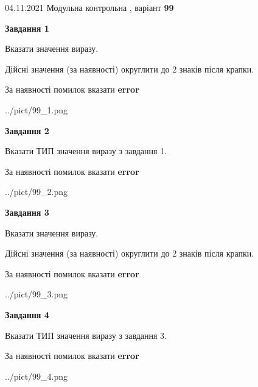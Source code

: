 \documentclass[11pt, ukrainian]{article}
\begin{document}
{04.11.2021 Модульна контрольна , варіант  \No \textbf { 99 }\par}
{
\begin {large}
{\begin {center}\textbf{Завдання 1}\end {center}}\par
Вказати значення виразу. \par
Дійсні значення (за наявності) округлити до 2 знаків після крапки. \par
За наявності помилок вказати \textbf{error}

\begin{center}
	{../pict/99_1.png}
\end{center}
\newpage

{\begin {center}\textbf{Завдання 2}\end {center}}\par
Вказати ТИП значення виразу з завдання 1. \par
За наявності помилок вказати \textbf{error}

\begin{center}
	{../pict/99_2.png}
\end{center}
\newpage

{\begin {center}\textbf{Завдання 3}\end {center}}\par
Вказати значення виразу. \par
Дійсні значення (за наявності) округлити до 2 знаків після крапки. \par
За наявності помилок вказати \textbf{error}

\begin{center}
	{../pict/99_3.png}
\end{center}
\newpage

{\begin {center}\textbf{Завдання 4}\end {center}}\par
Вказати ТИП значення виразу з завдання 3. \par
За наявності помилок вказати \textbf{error}

\begin{center}
	{../pict/99_4.png}
\end{center}
\newpage


\end{large}}
\end{document}
